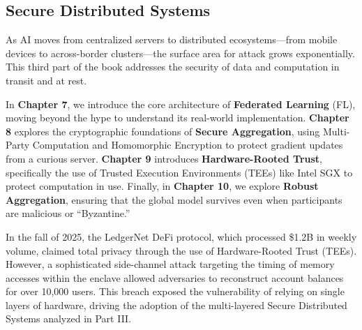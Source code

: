 % 
%

\begin{partbacktext}
\part{Secure Distributed Systems}
\noindent As AI moves from centralized servers to distributed ecosystems—from mobile devices to across-border clusters—the surface area for attack grows exponentially. This third part of the book addresses the security of data and computation in transit and at rest.

In \textbf{Chapter 7}, we introduce the core architecture of \textbf{Federated Learning} (FL), moving beyond the hype to understand its real-world implementation. \textbf{Chapter 8} explores the cryptographic foundations of \textbf{Secure Aggregation}, using Multi-Party Computation and Homomorphic Encryption to protect gradient updates from a curious server. \textbf{Chapter 9} introduces \textbf{Hardware-Rooted Trust}, specifically the use of Trusted Execution Environments (TEEs) like Intel SGX to protect computation in use. Finally, in \textbf{Chapter 10}, we explore \textbf{Robust Aggregation}, ensuring that the global model survives even when participants are malicious or ``Byzantine.''

\begin{casestudy} 
In the fall of 2025, the LedgerNet DeFi protocol, which processed \$1.2B in weekly volume, claimed total privacy through the use of Hardware-Rooted Trust (TEEs). However, a sophisticated side-channel attack targeting the timing of memory accesses within the enclave allowed adversaries to reconstruct account balances for over 10,000 users. This breach exposed the vulnerability of relying on single layers of hardware, driving the adoption of the multi-layered Secure Distributed Systems analyzed in Part III. 
\end{casestudy} 
\end{partbacktext}
